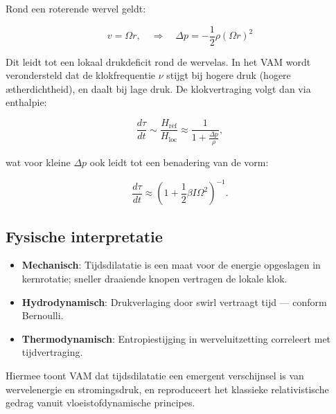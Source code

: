 Rond een roterende wervel geldt:

\[
v = \Omega r, \quad \Rightarrow \quad \Delta p = -\frac{1}{2} \rho (\Omega r)^2
\]

Dit leidt tot een lokaal drukdeficit rond de wervelas. In het VAM wordt verondersteld dat de klokfrequentie $\nu$ stijgt bij hogere druk (hogere ætherdichtheid), en daalt bij lage druk. De klokvertraging volgt dan via enthalpie:

\begin{equation}
\frac{d\tau}{dt} \sim \frac{H_\text{ref}}{H_\text{loc}} \approx \frac{1}{1 + \frac{\Delta p}{\rho}},
\end{equation}

wat voor kleine $\Delta p$ ook leidt tot een benadering van de vorm:

\begin{equation}
\frac{d\tau}{dt} \approx \left(1 + \frac{1}{2} \beta I \Omega^2 \right)^{-1}.
\end{equation}

\subsection{Fysische interpretatie}

\begin{itemize}
    \item \textbf{Mechanisch}: Tijdsdilatatie is een maat voor de energie opgeslagen in kernrotatie; sneller draaiende knopen vertragen de lokale klok.
    \item \textbf{Hydrodynamisch}: Drukverlaging door swirl vertraagt tijd — conform Bernoulli.
    \item \textbf{Thermodynamisch}: Entropiestijging in werveluitzetting correleert met tijdvertraging.
\end{itemize}

Hiermee toont VAM dat tijdsdilatatie een emergent verschijnsel is van wervelenergie en stromingsdruk, en reproduceert het klassieke relativistische gedrag vanuit vloeistofdynamische principes.

